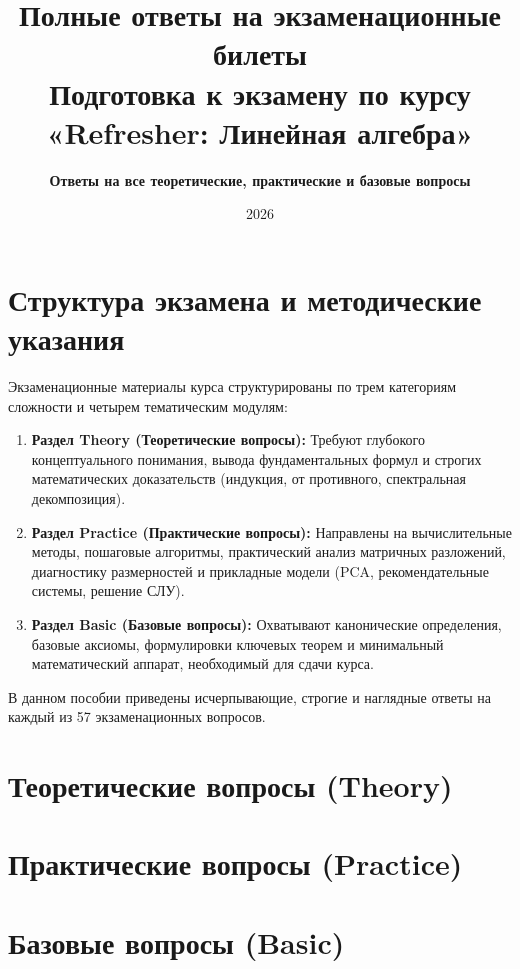 \documentclass[12pt,a4paper]{report}
\title{\textbf{\LARGE Полные ответы на экзаменационные билеты}\\[4mm]
\Large Подготовка к экзамену по курсу «Refresher: Линейная алгебра»}
\author{\textbf{Ответы на все теоретические, практические и базовые вопросы}}
\date{2026}
\theoremstyle{definition}
\theoremstyle{plain}
\begin{document}
    \maketitle

    \tableofcontents
    \newpage

    \chapter*{Структура экзамена и методические указания}

Экзаменационные материалы курса структурированы по трем категориям сложности и четырем тематическим модулям:
    \begin{enumerate}
        \item \textbf{Раздел Theory (Теоретические вопросы):} Требуют глубокого концептуального понимания, вывода
        фундаментальных формул и строгих математических доказательств
        (индукция, от противного, спектральная декомпозиция).
        \item \textbf{Раздел Practice (Практические вопросы):} Направлены на вычислительные методы, пошаговые алгоритмы,
        практический анализ матричных разложений, диагностику размерностей и прикладные модели (PCA, рекомендательные
        системы, решение СЛУ).
        \item \textbf{Раздел Basic (Базовые вопросы):} Охватывают канонические определения, базовые аксиомы,
        формулировки ключевых теорем и минимальный математический аппарат, необходимый для сдачи курса.
    \end{enumerate}

В данном пособии приведены исчерпывающие, строгие и наглядные ответы на каждый из 57 экзаменационных вопросов.

    \newpage


    \chapter{Теоретические вопросы (Theory)}


    \chapter{Практические вопросы (Practice)}


    \chapter{Базовые вопросы (Basic)}

\end{document}
